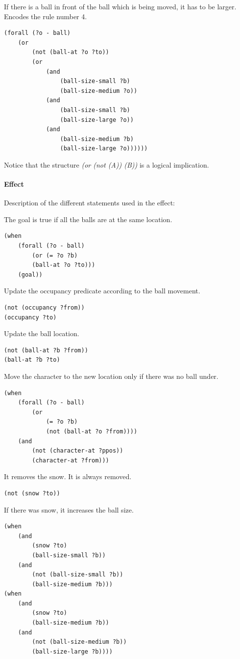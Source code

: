 \documentclass{report}
\theoremstyle{plain}
\begin{document}
If there is a ball in front of the ball which is being moved, it has to be larger. Encodes the rule number 4.
\begin{lstlisting}
(forall (?o - ball)
    (or
        (not (ball-at ?o ?to))
        (or 
            (and
                (ball-size-small ?b)
                (ball-size-medium ?o))
            (and
                (ball-size-small ?b)
                (ball-size-large ?o))
            (and
                (ball-size-medium ?b)
                (ball-size-large ?o))))))
\end{lstlisting}

\vspace{1\baselineskip}

Notice that the structure \textit{(or (not (A)) (B))} is a logical implication.

\paragraph{Effect}
Description of the different statements used in the effect:

The goal is true if all the balls are at the same location.
\begin{lstlisting}
(when
    (forall (?o - ball)
        (or (= ?o ?b)
        (ball-at ?o ?to)))
    (goal))
\end{lstlisting}

Update the occupancy predicate according to the ball movement.
\begin{lstlisting}
(not (occupancy ?from))
(occupancy ?to)
\end{lstlisting}

Update the ball location.
\begin{lstlisting}
(not (ball-at ?b ?from))
(ball-at ?b ?to)
\end{lstlisting}

Move the character to the new location only if there was no ball under.
\begin{lstlisting}
(when
    (forall (?o - ball)
        (or 
            (= ?o ?b)
            (not (ball-at ?o ?from))))
    (and
        (not (character-at ?ppos))
        (character-at ?from)))
\end{lstlisting}

It removes the snow. It is always removed.
\begin{lstlisting}
(not (snow ?to))
\end{lstlisting}

If there was snow, it increases the ball size.
\begin{lstlisting}
(when
    (and
        (snow ?to)
        (ball-size-small ?b))
    (and
        (not (ball-size-small ?b))
        (ball-size-medium ?b)))
(when
    (and
        (snow ?to)
        (ball-size-medium ?b))
    (and
        (not (ball-size-medium ?b))
        (ball-size-large ?b))))
\end{lstlisting}
\end{document}
